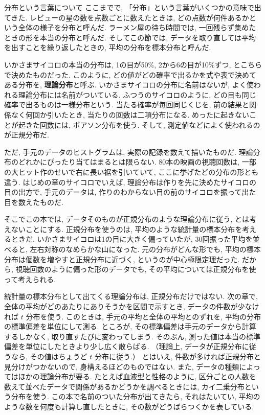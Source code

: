     \begin{mybox}{分布という言葉について}
      ここまでで, 「分布」という言葉がいくつかの意味で出てきた.
      レビューの星の数を点数ごとに数えたときは, どの点数が何件あるかという全体の様子を分布と呼んだ.
      ラーメン屋の待ち時間では, 一回残らず集めたときの形を本当の分布と呼んだ.
      そしてこの節では, データを取り直しては平均を出すことを繰り返したときの, 平均の分布を標本分布と呼んだ.

      いかさまサイコロの本当の分布は, 1の目が50\%, 2から6の目が10\%ずつ, とこちらで決めたものだった.
      このように, どの値がどの確率で出るかを式や表で決めてある分布を, \textbf{理論分布}と呼ぶ.
      いかさまサイコロの分布に名前はないが, よく使われる理論分布には名前がついている.
      ふつうのサイコロのように, どの目も同じ確率で出るものは一様分布という.
      当たる確率が毎回同じくじを, 前の結果と関係なく何回か引いたとき, 当たりの回数は二項分布になる.
      めったに起きないことが起きた回数には, ポアソン分布を使う.
      そして, 測定値などによく使われるのが正規分布だ.

      ただ, 手元のデータのヒストグラムは, 実際の記録を数えて描いたものだ.
      理論分布のどれかにぴったり当てはまるとは限らない.
      80本の映画の視聴回数は, 一部の大ヒット作のせいで右に長い裾を引いていて, ここに挙げたどの分布の形とも違う.
      はじめの章のサイコロでいえば, 理論分布は作りを先に決めたサイコロの目の出方で, 手元のデータは, 作りのわからない目の前のサイコロを振って出た目を数えたものだ.

      そこでこの本では, データそのものが正規分布のような理論分布に従う, とは考えないことにする.
      正規分布を使うのは, 平均のような統計量の標本分布を考えるときだ.
      いかさまサイコロは1の目に大きく偏っていたが, 30回振った平均を並べると, 左右対称のなめらかな山になった.
      元の分布がどんな形でも, 平均の標本分布は個数を増やすと正規分布に近づく, というのが中心極限定理だった.
      だから, 視聴回数のように偏った形のデータでも, その平均については正規分布を使って考えられる.

      統計量の標本分布として出てくる理論分布は, 正規分布だけではない.
      次の章で, 全体の平均がどのあたりにありそうかを区間で示すとき, データの件数が少なければ $t$ 分布を使う.
      このときは, 手元の平均と全体の平均とのずれを, 平均の分布の標準偏差を単位にして測る.
      ところが, その標準偏差は手元のデータから計算するしかなく, 取り直すたびに変わってしまう.
      そのぶん, 測った値は本当の標準偏差を単位にしたときより少し広く散らばる.
      （理論上, データが正規分布に従うなら, その値はちょうど $t$ 分布に従う.）
      とはいえ, 件数が多ければ正規分布と見分けがつかないので, 身構えるほどのものではない.
      また, データの種類によってはほかの理論分布が要る.
      たとえば血液型と性格のように, 区分ごとの人数を数えて並べたデータで関係があるかどうかを調べるときには, カイ二乗分布という分布を使う.
      この本で名前のついた分布が出てきたら, それはたいてい, 平均のような数を何度も計算し直したときに, その数がどうばらつくかを表している.
    \end{mybox}

